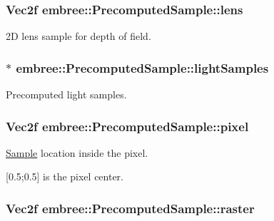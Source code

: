 \hypertarget{structembree_1_1_precomputed_sample_a3aebb258d27d6c2555d2f8ee0f5bc6b1}{
\subsubsection[{lens}]{\setlength{\rightskip}{0pt plus 5cm}Vec2f {\bf embree::PrecomputedSample::lens}}}
\label{structembree_1_1_precomputed_sample_a3aebb258d27d6c2555d2f8ee0f5bc6b1}


2D lens sample for depth of field. 

\hypertarget{structembree_1_1_precomputed_sample_acfe1e485e8834d42e38cc076b7b40bc5}{
\subsubsection[{lightSamples}]{$\ast$ {\bf embree::PrecomputedSample::lightSamples}}}
\label{structembree_1_1_precomputed_sample_acfe1e485e8834d42e38cc076b7b40bc5}


Precomputed light samples. 

\hypertarget{structembree_1_1_precomputed_sample_a03538d74672d4cb9562d676aa1e6bb86}{
\subsubsection[{pixel}]{\setlength{\rightskip}{0pt plus 5cm}Vec2f {\bf embree::PrecomputedSample::pixel}}}
\label{structembree_1_1_precomputed_sample_a03538d74672d4cb9562d676aa1e6bb86}


\hyperlink{structembree_1_1_sample}{Sample} location inside the pixel. 

\mbox{[}0.5;0.5\mbox{]} is the pixel center. \hypertarget{structembree_1_1_precomputed_sample_a8f8f6b2cb738ab9627878360f898ec3e}{
\subsubsection[{raster}]{\setlength{\rightskip}{0pt plus 5cm}Vec2f {\bf embree::PrecomputedSample::raster}}}
\label{structembree_1_1_precomputed_sample_a8f8f6b2cb738ab9627878360f898ec3e}


